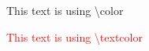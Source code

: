\documentclass{scrbook}
\begin{document}
    \color{red} This text is using \textbackslash color
    
    \textcolor{red}{This text is using \textbackslash textcolor}
\end{document}
